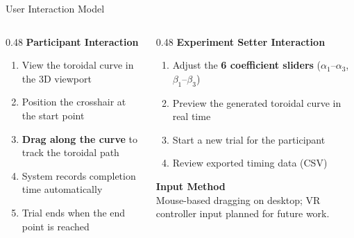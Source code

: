 \documentclass[aspectratio=169, 10pt]{beamer}
\begin{document}
\begin{frame}{User Interaction Model}
  \begin{columns}[T]
    \begin{column}{0.48\textwidth}
      \textbf{Participant Interaction}
      \begin{enumerate}
        \item View the toroidal curve in the 3D viewport
        \item Position the crosshair at the start point
        \item \textbf{Drag along the curve} to track the toroidal path
        \item System records completion time automatically
        \item Trial ends when the end point is reached
      \end{enumerate}
    \end{column}
    \begin{column}{0.48\textwidth}
      \textbf{Experiment Setter Interaction}
      \begin{enumerate}
        \item Adjust the \textbf{6 coefficient sliders} ($\alpha_1$--$\alpha_3$, $\beta_1$--$\beta_3$)
        \item Preview the generated toroidal curve in real time
        \item Start a new trial for the participant
        \item Review exported timing data (CSV)
      \end{enumerate}

      \vspace{0.5em}
      \textbf{Input Method}\\
      Mouse-based dragging on desktop; VR controller input planned for future work.
    \end{column}
  \end{columns}
\end{frame}
\end{document}
